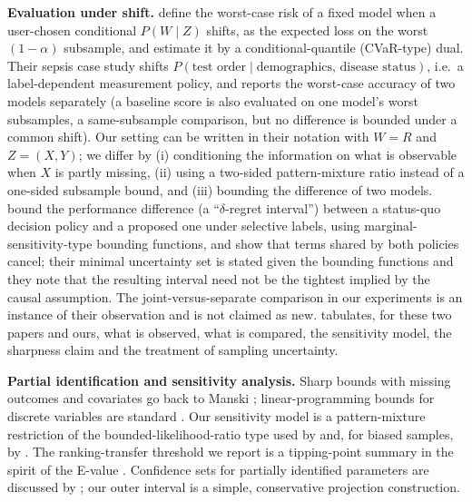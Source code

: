 \documentclass{article}
\theoremstyle{plain}
\theoremstyle{definition}
\theoremstyle{remark}
\begin{document}
\textbf{Evaluation under shift.} \citet{subbaswamy2021evaluating} define the
worst-case risk of a fixed model when a user-chosen conditional $P(W\mid Z)$
shifts, as the expected loss on the worst $(1-\alpha)$ subsample, and
estimate it by a conditional-quantile (CVaR-type) dual. Their sepsis case
study shifts $P(\text{test order}\mid \text{demographics, disease status})$,
i.e.\ a label-dependent measurement policy, and reports the worst-case
accuracy of two models separately (a baseline score is also evaluated on one
model's worst subsamples, a same-subsample comparison, but no difference is
bounded under a common shift). Our setting can be written in their
notation with $W=R$ and $Z=(X,Y)$; we differ by (i) conditioning the
information on what is observable when $X$ is partly missing, (ii) using a
two-sided pattern-mixture ratio instead of a one-sided subsample bound, and
(iii) bounding the difference of two models. \citet{guerdan2024predictive}
bound the performance difference (a ``$\delta$-regret interval'') between a
status-quo decision policy and a proposed one under selective labels, using
marginal-sensitivity-type bounding functions, and show that terms shared by
both policies cancel; their minimal uncertainty set is stated given the
bounding functions and they note that the resulting interval need not be the
tightest implied by the causal assumption. The joint-versus-separate
comparison in our experiments is an instance of their observation and is not
claimed as new.  tabulates, for these two papers and ours, what
is observed, what is compared, the sensitivity model, the sharpness claim and
the treatment of sampling uncertainty.

\textbf{Partial identification and sensitivity analysis.} Sharp bounds with
missing outcomes and covariates go back to Manski
\cite{manski2003partial,horowitz2000nonparametric}; linear-programming bounds
for discrete variables are standard \cite{balke1997bounds}. Our sensitivity
model is a pattern-mixture restriction \cite{little1993pattern} of the
bounded-likelihood-ratio type used by
\citet{rosenbaum1987sensitivity,tan2006distributional,zhao2019sensitivity,dorn2023sharp}
and, for biased samples, by \citet{sahoo2022learning}. The ranking-transfer
threshold we report is a tipping-point summary in the spirit of the E-value
\cite{vanderweele2017sensitivity}. Confidence sets for partially identified
parameters are discussed by \citet{imbens2004confidence,stoye2009more}; our
outer interval is a simple, conservative projection construction.
\end{document}
